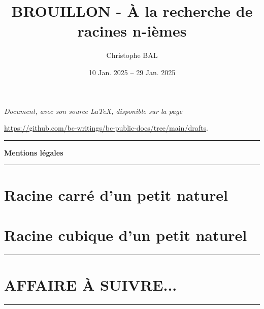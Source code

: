 \documentclass[12pt]{amsart}
\theoremstyle{method}
\newcommand\contentdir{\jobname}
\begin{document}
\title{BROUILLON - À la recherche de racines n-ièmes}
\author{Christophe BAL}
\date{10 Jan. 2025 -- 29 Jan. 2025}

\maketitle

\begin{center}
	\itshape
	Document, avec son source \LaTeX, disponible sur la page

	\url{https://github.com/bc-writings/bc-public-docs/tree/main/drafts}.
\end{center}


\bigskip


\begin{center}
	\hrule\vspace{.3em}
	{
		\fontsize{1.35em}{1em}\selectfont
		\textbf{Mentions \og légales \fg}
	}

	\vspace{0.45em}
	\doclicenseThis
	\hrule
\end{center}


\setcounter{tocdepth}{2}
\tableofcontents


\newpage
\section{Racine carré d'un petit naturel}




\section{Racine cubique d'un petit naturel}




\bigskip

\hrule

\section{AFFAIRE À SUIVRE...}

\bigskip

\hrule
\end{document}
